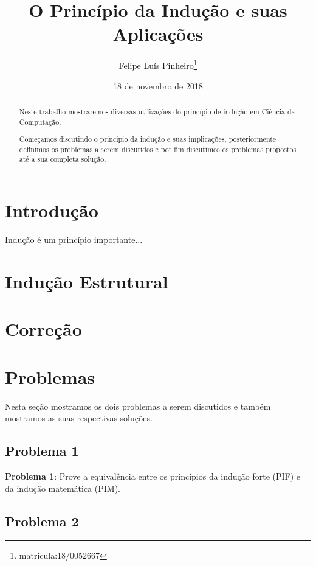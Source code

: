 \documentclass[a4paper, 10pt]{article}
\title{\LARGE \bf O Princípio da Indução e suas Aplicações }
\author{Felipe Luís Pinheiro\footnote{matricula:18/0052667}}
\date{ 18 de novembro de 2018}
\begin{document}
\maketitle

\begin{abstract}

Neste trabalho mostraremos diversas utilizações do princípio de indução em Ciência da Computação.

Começamos discutindo o principio da indução e suas implicações, posteriormente definimos os problemas a serem discutidos e por fim discutimos os problemas propostos até a sua completa solução.

\end{abstract}

\section{Introdução}

Indução  é um princípio importante...


\section{Indução Estrutural}

\section{Correção}

\section{Problemas}

Nesta seção mostramos os dois problemas a serem discutidos e também mostramos as suas respectivas soluções.

\subsection{Problema 1}

\textbf{Problema 1}: Prove a equivalência entre os princípios da indução forte (PIF) e da indução matemática (PIM)\cite{Apostila}.


\subsection{Problema 2}
\end{document}

